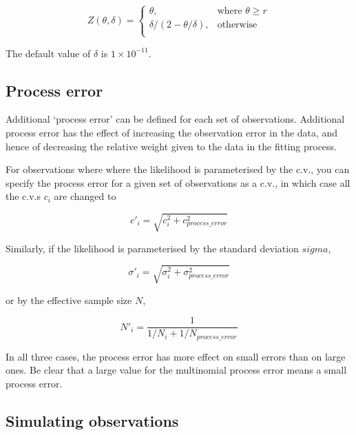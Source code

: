 \begin{equation}
   Z \left(\theta,\delta \right) = \begin{cases}
	  \theta, & \text{where $\theta \ge r$} \\
	  \delta/\left( 2-\theta/\delta \right), & \text{otherwise} \\  
  \end{cases}
\end{equation}

The default value of $\delta$ is $1 \times 10^{-11}$.

\subsection{Process error}

Additional `process error' can be defined for each set of observations. Additional process error has the effect of increasing the observation error in the data, and hence of decreasing the relative weight given to the data in the fitting process. 

For observations where where the likelihood is parameterised by the c.v., you can specify the process error for a given set of observations as a c.v., in which case all the c.v.s $c_i$ are changed to

\begin{equation}
  c'_i  = \sqrt {c_i^2  + c_{process\_error}^2 } 
\end{equation}

Similarly, if the likelihood is parameterised by the standard deviation $sigma$,

\begin{equation}
  \sigma '_i  = \sqrt {\sigma _i^2  + \sigma _{process\_error}^2 } 
\end{equation}

or by the effective sample size $N$,

\begin{equation}
 N'_i  = \frac{1}{1 / {N_i}+ 1 / N_{process\_error}}
\end{equation}

In all three cases, the process error has more effect on small errors than on large ones. Be clear that a large value for the multinomial process error means a small process error.

\subsection{Simulating observations}

